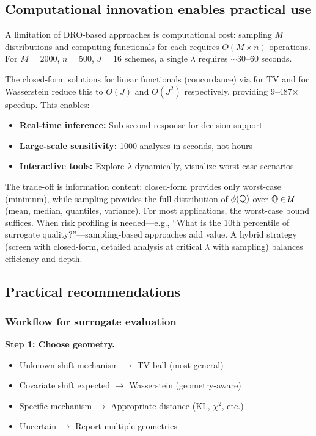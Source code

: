 \documentclass{article}
\begin{document}
\subsection{Computational innovation enables practical use}

A limitation of DRO-based approaches is computational cost: sampling $M$ distributions and computing functionals for each requires $O(M \times n)$ operations. For $M=2000$, $n=500$, $J=16$ schemes, a single $\lambda$ requires $\sim$30--60 seconds.

The closed-form solutions for linear functionals (concordance) via \cite{bentalnemirovski2013} for TV and \cite{esfahanikuhn2018} for Wasserstein reduce this to $O(J)$ and $O(J^2)$ respectively, providing 9--487$\times$ speedup. This enables:

\begin{itemize}
    \item \textbf{Real-time inference:} Sub-second response for decision support
    \item \textbf{Large-scale sensitivity:} 1000 analyses in seconds, not hours
    \item \textbf{Interactive tools:} Explore $\lambda$ dynamically, visualize worst-case scenarios
\end{itemize}

The trade-off is information content: closed-form provides only worst-case (minimum), while sampling provides the full distribution of $\phi(\mathbb{Q})$ over $\mathbb{Q} \in \mathcal{U}$ (mean, median, quantiles, variance). For most applications, the worst-case bound suffices. When risk profiling is needed---e.g., ``What is the 10th percentile of surrogate quality?''---sampling-based approaches add value. A hybrid strategy (screen with closed-form, detailed analysis at critical $\lambda$ with sampling) balances efficiency and depth.

\subsection{Practical recommendations}

\subsubsection{Workflow for surrogate evaluation}

\textbf{Step 1: Choose geometry.}
\begin{itemize}
    \item Unknown shift mechanism $\rightarrow$ TV-ball (most general)
    \item Covariate shift expected $\rightarrow$ Wasserstein (geometry-aware)
    \item Specific mechanism $\rightarrow$ Appropriate distance (KL, $\chi^2$, etc.)
    \item Uncertain $\rightarrow$ Report multiple geometries
\end{itemize}
\end{document}
